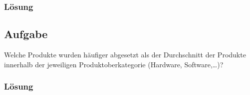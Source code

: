\subsubsection*{Lösung}
\label{sec:uebung_07.aufgabe_05.loesung}


\subsection{Aufgabe}
\label{sec:uebung_07.aufgabe_06}
Welche Produkte wurden häufiger abgesetzt als der Durchschnitt der Produkte innerhalb der jeweiligen Produktoberkategorie (Hardware, Software,…)?

\subsubsection*{Lösung}
\label{sec:uebung_07.aufgabe_06.loesung}
